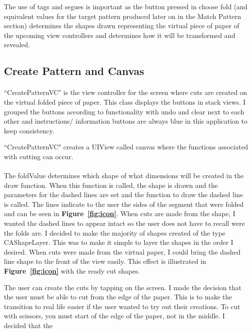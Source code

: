 \documentclass[11pt]{article}
\begin{document}
            The use of tags and segues is important as the button pressed in choose fold (and equivalent values for the target pattern produced later on in the Match Pattern section) determines the shapes drawn representing the virtual piece of paper of the upcoming view controllers and determines how it will be transformed and revealed.
            
                
            \subsection{Create Pattern and Canvas}
                \paragraph{}
                ``CreatePatternVC" is the view controller for the screen where cuts are created on the virtual folded piece of paper. This class displays the buttons in stack views. I grouped the buttons according to functionality with undo and clear next to each other and instructions/ information buttons are always blue in this application to keep consistency. 
                
                ``CreatePatternVC" creates a UIView called canvas where the functions associated with cutting can occur.
                    
                 \paragraph{}
                 The foldValue determines which shape of what dimensions will be created in the draw function. When this function is called, the shape is drawn and the parameters for the dashed lines are set and the function to draw the dashed line is called. The lines indicate to the user the sides of the segment that were folded and can be seen in \textbf{Figure~\ref{fig:icon}}.
                 When cuts are made from the shape, I wanted the dashed lines to appear intact so the user does not have to recall were the folds are. I decided to make the majority of shapes created of the type CAShapeLayer. This was to make it simple to layer the shapes in the order I desired. When cuts were made from the virtual paper, I could bring the dashed line shape to the front of the view easily. This effect is illustrated in \textbf{Figure~\ref{fig:icon}} with the ready cut shapes.
                 
                 The user can create the cuts by tapping on the screen. I made the decision that the user must be able to cut from the edge of the paper. This is to make the transition to real life easier if the user wanted to try out their creations. To cut with scissors, you must start of the edge of the paper, not in the middle. I decided that the
                 
\end{document}
